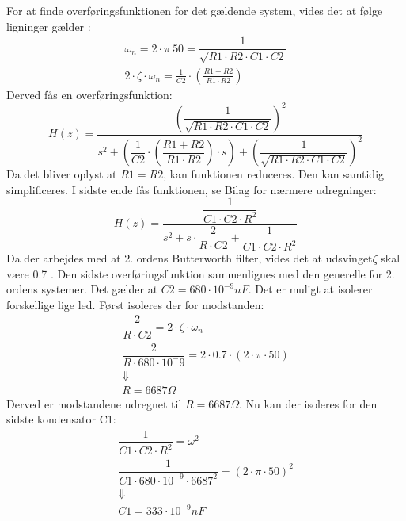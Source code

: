 For at finde overføringsfunktionen for det gældende system, vides det at følge ligninger gælder \cite{Wikilavpas}: 
\begin{equation}
\begin{split}
\omega_n = 2\cdot \pi\ 50 = \dfrac{1}{\sqrt{R1\cdot R2\cdot C1\cdot C2}}\\
2\cdot \zeta\cdot\omega_n =\frac{1}{C2}\cdot \left( \frac{R1+R2}{R1\cdot R2}\right)
\end{split}
\end{equation}
Derved fås en overføringsfunktion: 
\begin{equation}
H(z)=\frac{\left(\dfrac{1}{\sqrt{R1\cdot R2 \cdot C1\cdot C2}}\right)^2}{s^2+ \left( \dfrac{1}{C2} \cdot \left( \dfrac{R1+R2}{R1\cdot R2}\right) \cdot s \right) +\left( \dfrac{1}{\sqrt{R1\cdot R2 \cdot C1\cdot C2}}\right)^2 }
\end{equation}
Da det bliver oplyst at $ R1=R2 $, kan funktionen reduceres. Den kan samtidig simplificeres. I sidste ende fås funktionen, se Bilag for nærmere udregninger: 
\begin{equation}
H(z)=\dfrac{\dfrac{1}{C1 \cdot C2\cdot R^2}}{s^2+s\cdot \dfrac{2}{R\cdot C2}+ \dfrac{1}{C1\cdot C2\cdot R^2}}
\end{equation}
Da der arbejdes med at 2. ordens Butterworth filter, vides det at udsvinget$ \zeta $ skal være 0.7 \cite{ASB}. 
Den sidste overføringsfunktion sammenlignes med den generelle for 2. ordens systemer. Det gælder at $ C2 = 680\cdot 10^{-9} nF $. Det er muligt at isolerer forskellige lige led. Først isoleres der for modstanden: 
\begin{equation}
\begin{split}
\dfrac{2}{R\cdot C2}= 2\cdot \zeta \cdot \omega_n\\
\dfrac{2}{R\cdot 680\cdot 10^-9}=2\cdot 0.7 \cdot(2\cdot\pi\cdot 50)\\
\Downarrow\\
R= 6687 \Omega
\end{split}
\end{equation}
Derved er modstandene udregnet til $ R = 6687\Omega $. Nu kan der isoleres for den sidste kondensator C1: 
\begin{equation}
\begin{split}
\dfrac{1}{C1\cdot C2\cdot R^2}= \omega^2\\
\dfrac{1}{C1\cdot 680\cdot 10^{-9}\cdot 6687^2}= (2\cdot \pi \cdot 50)^2\\
\Downarrow\\
C1=333\cdot 10^{-9} nF
\end{split}
\end{equation}
